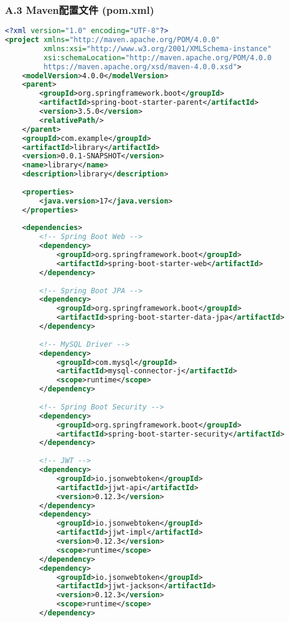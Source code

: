 \documentclass[12pt,a4paper]{article}
\begin{document}
\subsubsection*{A.3 Maven配置文件 (pom.xml)}
\begin{lstlisting}[language=xml]
<?xml version="1.0" encoding="UTF-8"?>
<project xmlns="http://maven.apache.org/POM/4.0.0" 
         xmlns:xsi="http://www.w3.org/2001/XMLSchema-instance"
         xsi:schemaLocation="http://maven.apache.org/POM/4.0.0 
         https://maven.apache.org/xsd/maven-4.0.0.xsd">
    <modelVersion>4.0.0</modelVersion>
    <parent>
        <groupId>org.springframework.boot</groupId>
        <artifactId>spring-boot-starter-parent</artifactId>
        <version>3.5.0</version>
        <relativePath/>
    </parent>
    <groupId>com.example</groupId>
    <artifactId>library</artifactId>
    <version>0.0.1-SNAPSHOT</version>
    <name>library</name>
    <description>library</description>
    
    <properties>
        <java.version>17</java.version>
    </properties>
    
    <dependencies>
        <!-- Spring Boot Web -->
        <dependency>
            <groupId>org.springframework.boot</groupId>
            <artifactId>spring-boot-starter-web</artifactId>
        </dependency>
        
        <!-- Spring Boot JPA -->
        <dependency>
            <groupId>org.springframework.boot</groupId>
            <artifactId>spring-boot-starter-data-jpa</artifactId>
        </dependency>
        
        <!-- MySQL Driver -->
        <dependency>
            <groupId>com.mysql</groupId>
            <artifactId>mysql-connector-j</artifactId>
            <scope>runtime</scope>
        </dependency>
        
        <!-- Spring Boot Security -->
        <dependency>
            <groupId>org.springframework.boot</groupId>
            <artifactId>spring-boot-starter-security</artifactId>
        </dependency>
        
        <!-- JWT -->
        <dependency>
            <groupId>io.jsonwebtoken</groupId>
            <artifactId>jjwt-api</artifactId>
            <version>0.12.3</version>
        </dependency>
        <dependency>
            <groupId>io.jsonwebtoken</groupId>
            <artifactId>jjwt-impl</artifactId>
            <version>0.12.3</version>
            <scope>runtime</scope>
        </dependency>
        <dependency>
            <groupId>io.jsonwebtoken</groupId>
            <artifactId>jjwt-jackson</artifactId>
            <version>0.12.3</version>
            <scope>runtime</scope>
        </dependency>
        

\end{lstlisting}
\end{document}
